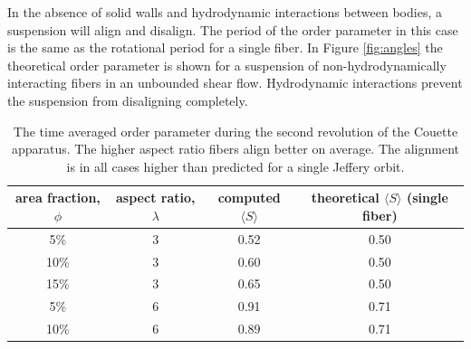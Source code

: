 \documentclass[preprint, 10pt]{elsarticle}
\begin{document}
In the absence of solid walls and hydrodynamic interactions between
bodies, a suspension will align and disalign. The period of the order
parameter in this case is the same as the rotational period for a single
fiber. In Figure \ref{fig:angles} the theoretical order parameter is
shown for a suspension of non-hydrodynamically interacting fibers in an
unbounded shear flow.  Hydrodynamic interactions prevent the suspension
from disaligning completely.



\begin{table}[!h]
\begin{center}
\begin{tabular}{c |c |c |c}
area fraction, $\phi$ & aspect ratio, $\lambda$ & computed $ \langle S \rangle$ & theoretical
$\langle S \rangle$ (single fiber)\\
\hline
5\%  & 3 & 0.52 & 0.50 \\
10\% & 3 & 0.60 & 0.50 \\
15\% & 3 & 0.65 & 0.50 \\
5\%  & 6 & 0.91 & 0.71 \\
10\% & 6 & 0.89 & 0.71
\end{tabular}
\end{center}
\caption{The time averaged order parameter during the second revolution of the Couette apparatus. The higher aspect ratio fibers align better on average. The alignment is in all cases higher than predicted for a single Jeffery orbit.
}\label{tab:order}
\end{table} 
\end{document}
